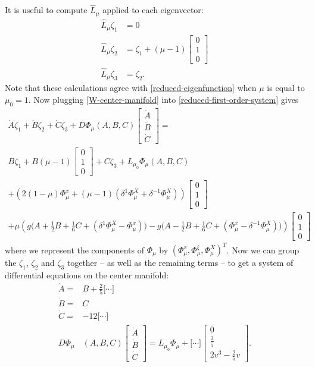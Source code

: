 It is useful to compute \(\widehat L_\mu\) applied to each eigenvector:
\begin{align}
	\widehat L_\mu \zeta_1 &= 0 \\
	\widehat L_\mu \zeta_2 &= \zeta _1  + (\mu-1)\begin{bmatrix}0 \\ 1 \\ 0 \end{bmatrix} \\
	\widehat L_\mu \zeta_3 &= \zeta_2.
\end{align}
Note that these calculations agree with \cref{reduced-eigenfunction} when \(\mu\) is equal to \(\mu_0 = 1\). Now plugging \cref{W-center-manifold} into \cref{reduced-first-order-system} gives
\begin{multline}
	\dot A \zeta_1 + \dot B \zeta_2 + \dot C \zeta_3 + D\Phi_\mu(A,B,C) \begin{bmatrix} \dot A \\ \dot B \\ \dot C \end{bmatrix} = \\
	B \zeta_1 + B(\mu-1) \begin{bmatrix}0 \\ 1 \\ 0 \end{bmatrix} + C \zeta_3 + L_{\mu_0} \Phi_\mu(A,B,C) \\
	+ \left(2(1-\mu) \Phi_\mu^x + (\mu-1)(\delta^1 \Phi_\mu^X + \delta^{-1} \Phi_\mu^X)\right) \begin{bmatrix}0 \\ 1 \\ 0 \end{bmatrix} \\
	+ \mu\left( g\big(A + \frac 1 2 B + \frac 1 6 C + (\delta^1 \Phi_\mu^X -\Phi_\mu^x)\big) - g\big(A - \frac 1 2 B + \frac 1 6 C + (\Phi_\mu^x - \delta^{-1} \Phi_\mu^X)\big) \right) \begin{bmatrix}0 \\ 1 \\ 0 \end{bmatrix}
\end{multline}
where we represent the components of \(\Phi_\mu\) by \((\Phi_\mu^x, \Phi_\mu^\xi, \Phi_\mu^X)^T\). Now we can group the \(\zeta_1\), \(\zeta_2\) and \(\zeta_3\) together -- as well as the remaining terms -- to get a system of differential equations on the center manifold:
\begin{align}
	\dot A =& B + \frac 2 5 \Big[ \cdots \Big] \label{dotA}\\
	\dot B =& C \label{dotB}\\
	\dot C =& -12 \Big[\cdots \Big] \label{dotC} \\
	D\Phi_\mu&(A,B,C) \begin{bmatrix} \dot A \\ \dot B \\ \dot C \end{bmatrix} = L_{\mu_0} \Phi_\mu + \Big[ \cdots \Big] \begin{bmatrix} 0 \\ \frac 35 \\ 2v^3 - \frac 2 5 v \end{bmatrix} \label{perp}.
\end{align}

